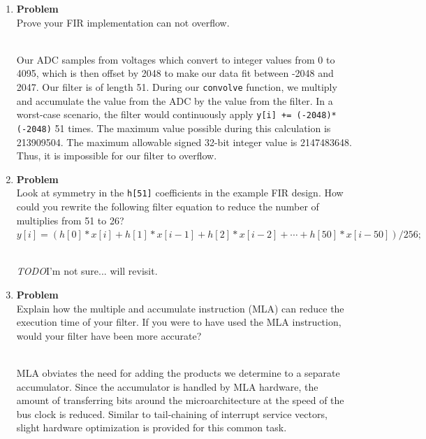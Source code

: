 \documentclass[12pt]{article}
\newenvironment{Ex}{\textbf{Problem}\vspace{.25em}\\}{}
\newcommand{\todo}{{\LARGE \emph{\color{red}TODO}}}
\newcommand{\hbr}{\hfill\vspace{.25em}\\}
\begin{document}
\begin{enumerate}[1)]
\begin{Ex}
    Can you estimate jitter in your ADC samples?
    \begin{solution} \hbr
      No, we did not implement jitter calculation in this lab. There
      should be little to no jitter, as timers are utlized to provide
      adc triggering and each interrupt service routine takes a
      consisten amount of time regardless of the data the ADC is
      sampling. Care was taken to make sure that the ISRs take an
      equal amount of time for this purpose.
    \end{solution}
  \end{Ex}
\item
  \begin{Ex}
    Prove your FIR implementation can not overflow.
    \begin{solution} \hbr
      Our ADC samples from voltages which convert to integer values
      from 0 to 4095, which is then offset by 2048 to make our data
      fit between -2048 and 2047. Our filter is of length 51. During
      our \verb|convolve| function, we multiply and accumulate the
      value from the ADC by the value from the filter. In a worst-case
      scenario, the filter would continuously apply
      \verb|y[i] += (-2048)*(-2048)| 51 times. The maximum value
      possible during this calculation is 213909504. The maximum
      allowable signed 32-bit integer value is 2147483648. Thus, it is
      impossible for our filter to overflow.
    \end{solution}
  \end{Ex}
\item
  \begin{Ex}
    Look at symmetry in the \verb|h[51]| coefficients in the example
    FIR design. How could you rewrite the following filter equation to
    reduce the number of multiplies from 51 to 26?
    $y[i]=(h[0]*x[i]+h[1]*x[i-1]+h[2]*x[i-2]+\cdots+h[50]*x[i-50])/256;$
    \begin{solution} \hbr
      \todo I'm not sure... will revisit.
    \end{solution}
  \end{Ex}
\item
  \begin{Ex}
    Explain how the multiple and accumulate instruction (MLA) can
    reduce the execution time of your filter. If you were to have used
    the MLA instruction, would your filter have been more accurate?

    \begin{solution} \hbr
      MLA obviates the need for adding the products we determine to a
      separate accumulator. Since the accumulator is handled by MLA
      hardware, the amount of transferring bits around the
      microarchitecture at the speed of the bus clock is reduced. Similar
      to tail-chaining of interrupt service vectors, slight hardware
      optimization is provided for this common task.


\end{solution}
\end{Ex}
\end{enumerate}
\end{document}
